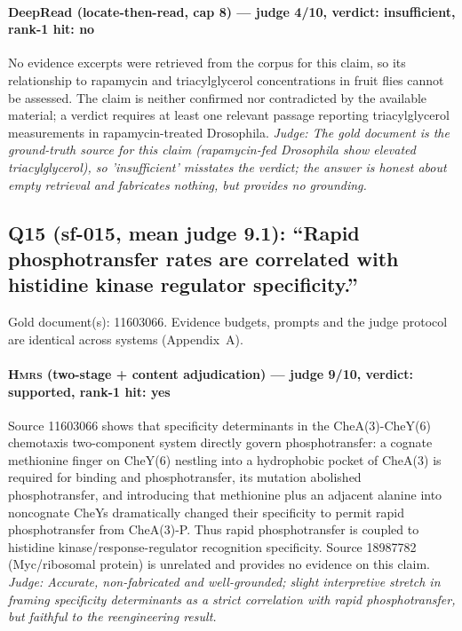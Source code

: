 \documentclass[sigconf, review, anonymous]{acmart}
\begin{document}
\paragraph{DeepRead (locate-then-read, cap 8) --- judge 4/10, verdict: insufficient, rank-1 hit: no}
\noindent No evidence excerpts were retrieved from the corpus for this claim, so its relationship to rapamycin and triacylglycerol concentrations in fruit flies cannot be assessed. The claim is neither confirmed nor contradicted by the available material; a verdict requires at least one relevant passage reporting triacylglycerol measurements in rapamycin-treated Drosophila.
\noindent\small\textit{Judge: The gold document is the ground-truth source for this claim (rapamycin-fed Drosophila show elevated triacylglycerol), so 'insufficient' misstates the verdict; the answer is honest about empty retrieval and fabricates nothing, but provides no grounding.}

\subsection{Q15 (sf-015, mean judge 9.1): ``Rapid phosphotransfer rates are correlated with histidine kinase regulator specificity.''}
\label{app:q15}
\noindent Gold document(s): 11603066. Evidence budgets, prompts and the judge protocol are identical across systems (Appendix~A).
\paragraph{\textbf{\textsc{Hmrs}} (two-stage + content adjudication) --- judge 9/10, verdict: supported, rank-1 hit: yes}
\noindent Source 11603066 shows that specificity determinants in the CheA(3)-CheY(6) chemotaxis two-component system directly govern phosphotransfer: a cognate methionine finger on CheY(6) nestling into a hydrophobic pocket of CheA(3) is required for binding and phosphotransfer, its mutation abolished phosphotransfer, and introducing that methionine plus an adjacent alanine into noncognate CheYs dramatically changed their specificity to permit rapid phosphotransfer from CheA(3)-P. Thus rapid phosphotransfer is coupled to histidine kinase/response-regulator recognition specificity. Source 18987782 (Myc/ribosomal protein) is unrelated and provides no evidence on this claim.
\noindent\small\textit{Judge: Accurate, non-fabricated and well-grounded; slight interpretive stretch in framing specificity determinants as a strict correlation with rapid phosphotransfer, but faithful to the reengineering result.}
\end{document}
